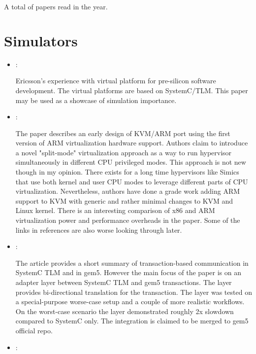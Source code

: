 



A total of  papers read in the year.

\section*{Simulators}

\begin{itemize}
    \item \cite{Dahl:Ericsson-VP:2016}:

    Ericsson's experience with virtual platform for pre-silicon software development. The virtual platforms are based on SystemC/TLM. This paper may be used as a showcase of simulation importance.

    \item \cite{Dall:KVM-ARM:2014}:

    The paper describes an early design of KVM/ARM port using the first version of ARM virtualization hardware support. Authors claim to introduce a novel "split-mode" virtualization approach as a way to run hypervisor simultaneously in different CPU privileged modes. This approach is not new though in my opinion. There exists for a long time hypervisors like Simics that use both kernel and user CPU modes to leverage different parts of CPU virtualization. Nevertheless, authors have done a grade work adding ARM support to KVM with generic and rather minimal changes to KVM and Linux kernel. There is an interesting comparison of x86 and ARM virtualization power and performance overheads in the paper. Some of the links in references are also worse looking through later.

    \item \cite{Menard:SystemC-gem5:2017}:

    The article provides a short summary of transaction-based communication in SystemC TLM and in gem5. However the main focus of the paper is on an adapter layer between SystemC TLM and gem5 transactions. The layer provides bi-directional translation for the transaction. The layer was tested on a special-purpose worse-case setup and a couple of more realistic workflows. On the worst-case scenario the layer demonstrated roughly 2x slowdown compared to SystemC only. The integration is claimed to be merged to gem5 official repo.

    \item \cite{Sandberg:FullSpeedAhead:2015}:


\end{itemize}
